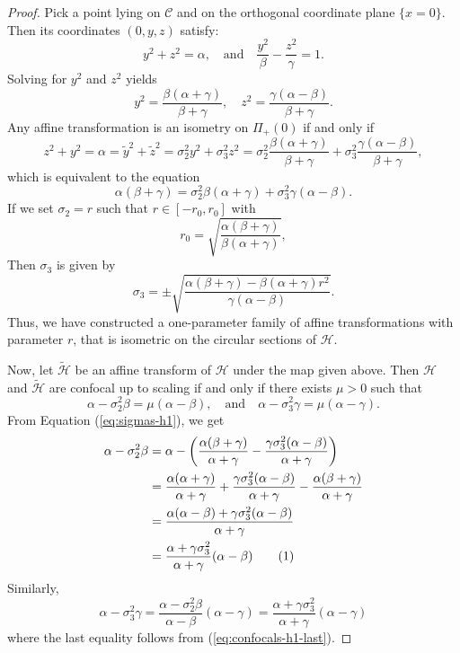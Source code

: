 \documentclass[10pt, a4paper]{article}
\newcommand\numberthis{\addtocounter{equation}{1}\tag{\theequation}}
\theoremstyle{BoldTopSpacing}
\theoremstyle{BoldTopSpacing}
\theoremstyle{BoldTopSpacing}
\theoremstyle{BoldTopBottomSpacing}
\theoremstyle{BoldTopSpacing}
\theoremstyle{BoldTopBottomSpacing}
\theoremstyle{remark}
\begin{document}
\begin{proof}
Pick a point lying on $\mathcal{C}$ and on the orthogonal coordinate plane $\{x = 0\}$. Then its coordinates $(0, y, z)$ satisfy:
\[
    y^2 + z^2 = \alpha, \quad \text{and} \quad \frac{y^2}{\beta} - \frac{z^2}{\gamma} = 1.
\]
Solving for $y^2$ and $z^2$ yields
\[
    y^2 = \frac{\beta(\alpha + \gamma)}{\beta + \gamma}, \quad z^2 = \frac{\gamma(\alpha - \beta)}{\beta + \gamma}.
\]
Any affine transformation is an isometry on $\Pi_{+}(0)$ if and only if
\[
    z^2 + y^2 = \alpha = \tilde{y}^2 + \tilde{z}^2 = \sigma_{2}^2 y^2 + \sigma_{3}^2 z^2 = \sigma_{2}^2 \frac{\beta(\alpha + \gamma)}{\beta + \gamma} + \sigma_{3}^2 \frac{\gamma(\alpha - \beta)}{\beta + \gamma},
\]
which is equivalent to the equation
\begin{equation*}
    \alpha (\beta + \gamma) = \sigma_{2}^2 \beta(\alpha + \gamma) + \sigma_{3}^2 \gamma(\alpha - \beta).
\end{equation*}
If we set $\sigma_{2} = r$ such that $r \in [-r_0, r_0]$ with
\[
    r_{0} = \sqrt{\frac{\alpha (\beta + \gamma)}{\beta (\alpha + \gamma)}},
\]
Then $\sigma_3$ is given by
\[
    \sigma_{3} = \pm \sqrt{\frac{\alpha(\beta + \gamma) - \beta(\alpha + \gamma)r^2}{\gamma(\alpha - \beta)}}.
\]
Thus, we have constructed a one-parameter family of affine transformations with parameter $r$, that is isometric on the circular sections of $\mathcal{H}$. \par
Now, let $\tilde{\mathcal{H}}$ be an affine transform of $\mathcal{H}$ under the map given above. Then $\mathcal{H}$ and $\tilde{\mathcal{H}}$ are confocal up to scaling if and only if there exists $\mu > 0$ such that
\[
    \alpha - \sigma^2_{2} \beta = \mu (\alpha - \beta), \quad \text{and} \quad \alpha - \sigma_{3}^2 \gamma = \mu (\alpha - \gamma).
\]
From Equation (\ref{eq:sigmas-h1}), we get
\begin{align*}
\alpha - \sigma^2_{2} \beta &=  \alpha - \left( \frac{\alpha (\beta + \gamma)}{\alpha + \gamma} -  \frac{\gamma \sigma^2_{3} (\alpha - \beta)}{\alpha + \gamma} \right) \\
&= \frac{\alpha (\alpha + \gamma)}{\alpha + \gamma} + \frac{\gamma \sigma^2_{3} (\alpha - \beta)}{\alpha + \gamma} - \frac{\alpha (\beta + \gamma)}{\alpha + \gamma} \\
&= \frac{\alpha (\alpha - \beta) + \gamma \sigma^2_{3} (\alpha - \beta)}{\alpha + \gamma} \\
&= \frac{\alpha + \gamma \sigma^2_{3}}{\alpha + \gamma} (\alpha - \beta) \numberthis \label{eq:confocals-h1-last}
\end{align*}
Similarly,
\[
\alpha - \sigma_{3}^2 \gamma = \frac{\alpha - \sigma^2_{2} \beta}{\alpha - \beta}(\alpha - \gamma) = \frac{\alpha + \gamma \sigma^2_{3}}{\alpha + \gamma} (\alpha - \gamma)
\]
where the last equality follows from (\ref{eq:confocals-h1-last}).
\end{proof}
\end{document}
